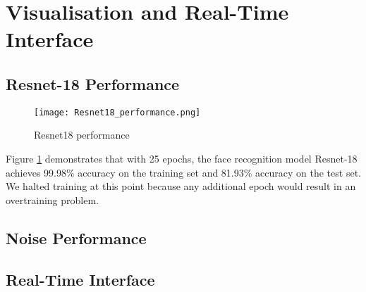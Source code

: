 \section{Visualisation and Real-Time Interface}

\subsection{Resnet-18 Performance}

\begin{figure}[h]
    \centering
    \texttt{[image: Resnet18\_performance.png]}
    \caption{Resnet18 performance}
    \label{fig:resnet18_performance}
\end{figure}

Figure \ref{fig:resnet18_performance} demonstrates that with 25 epochs, the face recognition model Resnet-18 achieves 99.98\% accuracy on the training set and 81.93\% accuracy on the test set. We halted training at this point because any additional epoch would result in an overtraining problem.

\subsection{Noise Performance}

\subsection{Real-Time Interface}


